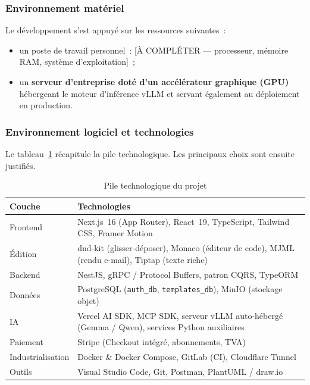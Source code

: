 \documentclass[12pt,a4paper,oneside]{report}
\begin{document}
\subsubsection{Environnement matériel}
Le développement s'est appuyé sur les ressources suivantes~:
\begin{itemize}[leftmargin=1.4cm,nosep]
  \item un poste de travail personnel~: [À COMPLÉTER — processeur, mémoire
  RAM, système d'exploitation]~;
  \item un \textbf{serveur d'entreprise doté d'un accélérateur graphique
  (GPU)} hébergeant le moteur d'inférence vLLM et servant également au
  déploiement en production.
\end{itemize}

\subsubsection{Environnement logiciel et technologies}
Le tableau~\ref{tab:techno} récapitule la pile technologique. Les
principaux choix sont ensuite justifiés.

\begin{table}[H]
\centering
\caption{Pile technologique du projet}
\label{tab:techno}
\small
\begin{tabularx}{\linewidth}{lX}
\toprule
\textbf{Couche} & \textbf{Technologies} \\
\midrule
Frontend & Next.js~16 (App Router), React~19, TypeScript, Tailwind CSS, Framer Motion \\
Édition & dnd-kit (glisser-déposer), Monaco (éditeur de code), MJML (rendu e-mail), Tiptap (texte riche) \\
Backend & NestJS, gRPC / Protocol Buffers, patron CQRS, TypeORM \\
Données & PostgreSQL (\texttt{auth\_db}, \texttt{templates\_db}), MinIO (stockage objet) \\
IA & Vercel AI SDK, MCP SDK, serveur vLLM auto-hébergé (Gemma / Qwen), services Python auxiliaires \\
Paiement & Stripe (Checkout intégré, abonnements, TVA) \\
Industrialisation & Docker \& Docker Compose, GitLab (CI), Cloudflare Tunnel \\
Outils & Visual Studio Code, Git, Postman, PlantUML / draw.io \\
\bottomrule
\end{tabularx}
\end{table}
\end{document}
